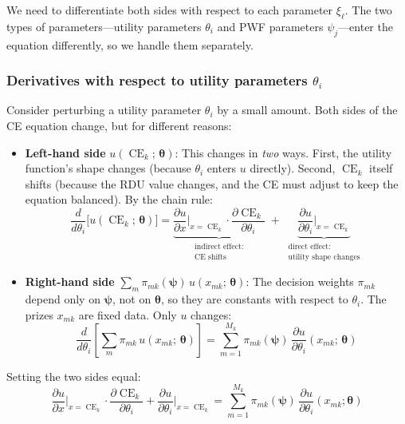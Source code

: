\documentclass[11pt,a4paper]{article}
\theoremstyle{definition}
\newcommand{\btheta}{\boldsymbol{\theta}}
\newcommand{\bpsi}{\boldsymbol{\psi}}
\DeclareMathOperator{\CE}{CE}
\begin{document}
We need to differentiate both sides with respect to each parameter
$\xi_\ell$. The two types of parameters---utility parameters $\theta_i$ and
PWF parameters $\psi_j$---enter the equation differently, so we handle them
separately.

\subsubsection{Derivatives with respect to utility parameters $\theta_i$}

Consider perturbing a utility parameter $\theta_i$ by a small amount. Both
sides of the CE equation change, but for different reasons:
\begin{itemize}
    \item \textbf{Left-hand side} $u(\CE_k;\, \btheta)$: This changes in
    \emph{two} ways. First, the utility function's shape changes (because
    $\theta_i$ enters $u$ directly). Second, $\CE_k$ itself shifts (because
    the RDU value changes, and the CE must adjust to keep the equation
    balanced). By the chain rule:
    \begin{equation}
        \frac{d}{d\theta_i}\!\Big[u(\CE_k;\, \btheta)\Big]
        = \underbrace{
            \frac{\partial u}{\partial x}\bigg|_{x=\CE_k}
            \cdot \frac{\partial \CE_k}{\partial \theta_i}
        }_{\substack{\text{indirect effect:}\\\text{CE shifts}}}
        \;+\;
        \underbrace{
            \frac{\partial u}{\partial \theta_i}\bigg|_{x=\CE_k}
        }_{\substack{\text{direct effect:}\\\text{utility shape changes}}}
    \end{equation}

    \item \textbf{Right-hand side}
    $\sum_m \pi_{mk}(\bpsi)\, u(x_{mk};\, \btheta)$: The decision weights
    $\pi_{mk}$ depend only on $\bpsi$, not on $\btheta$, so they are
    constants with respect to $\theta_i$. The prizes $x_{mk}$ are fixed data.
    Only $u$ changes:
    \begin{equation}
        \frac{d}{d\theta_i}\!\left[\sum_m \pi_{mk}\, u(x_{mk};\, \btheta)
        \right]
        = \sum_{m=1}^{M_k} \pi_{mk}(\bpsi) \,
        \frac{\partial u}{\partial \theta_i}(x_{mk};\, \btheta)
    \end{equation}
\end{itemize}

Setting the two sides equal:
\begin{equation}
    \frac{\partial u}{\partial x}\bigg|_{x=\CE_k} \cdot
    \frac{\partial \CE_k}{\partial \theta_i}
    + \frac{\partial u}{\partial \theta_i}\bigg|_{x=\CE_k}
    = \sum_{m=1}^{M_k} \pi_{mk}(\bpsi) \,
    \frac{\partial u}{\partial \theta_i}(x_{mk}; \btheta)
\end{equation}
\end{document}
